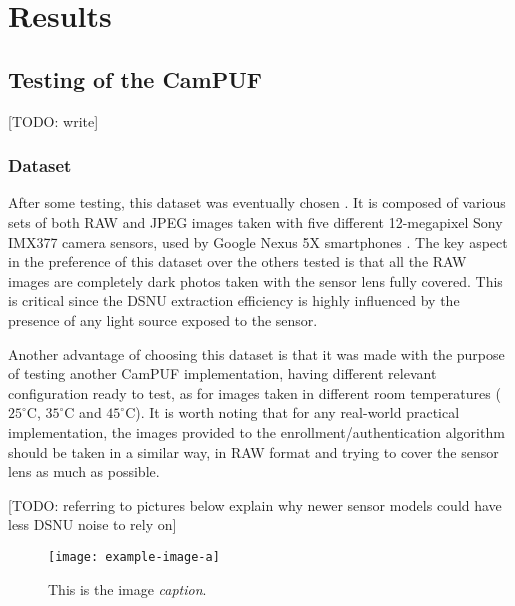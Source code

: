 \chapter{Results}\label{sec:results}

\section{Testing of the CamPUF}
[TODO: write]

\subsection{Dataset}\label{sec:dataset}
After some testing, this dataset was eventually chosen \cite{dataset_url}. It is composed of various sets of both RAW and JPEG images taken with five different 12-megapixel Sony IMX377 camera sensors, used by Google Nexus 5X smartphones \cite{dataset_explanation}. The key aspect in the preference of this dataset over the others tested is that all the RAW images are completely dark photos taken with the sensor lens fully covered. This is critical since the DSNU extraction efficiency is highly influenced by the presence of any light source exposed to the sensor.

Another advantage of choosing this dataset is that it was made with the purpose of testing another CamPUF implementation, having different relevant configuration ready to test, as for images taken in different room temperatures ($25^{\circ}$C, $35^{\circ}$C and $45^{\circ}$C). It is worth noting that for any real-world practical implementation, the images provided to the enrollment/authentication algorithm should be taken in a similar way, in RAW format and trying to cover the sensor lens as much as possible.

[TODO: referring to pictures below explain why newer sensor models could have less DSNU noise to rely on]

\begin{figure}[h!]
	\vspace{0.5cm}
	\texttt{[image: example-image-a]}
	\caption{This is the image \emph{caption}.}
	\label{fig:dataset}
\end{figure} 

